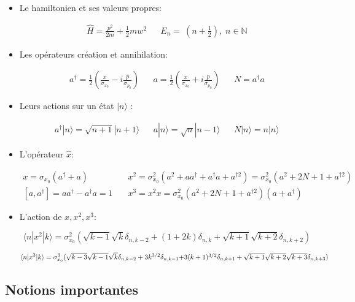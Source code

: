 \begin{itemize}[label=]

	\item Le hamiltonien et ses valeurs propres:

	\begin{align*}
		\hat{H}= \frac{p^2}{2m}+ \frac{1}{2}mw^2 &&
		E_n= \ \left(n+\frac{1}{2}\right), \; n\in \mathbb{N}
	\end{align*}

	\item Les opérateurs création et annihilation: 

	\begin{align*}
		a^{\dag}=\frac{1}{2}\left(\frac{x}{\sigma_{x_0}}-i\frac{p}{\sigma_{p_0}}\right) &&
		a=\frac{1}{2}\left(\frac{x}{\sigma_{x_0}}+i\frac{p}{\sigma_{p_0}}\right) &&
		N=a^{\dag}a
	\end{align*}

	\item Leurs actions sur un état $|n \rangle$ :

	\begin{align*}
		a^{\dag}|n \rangle = \sqrt{n+1}|n+1 \rangle &&
		a|n \rangle = \sqrt{n}|n-1 \rangle &&
		N|n \rangle = n|n \rangle
	\end{align*}

	\item L'opérateur $\hat{x}$:

	\begin{align*}
		x=\sigma_{x_0} (a^{\dag}+a)\qquad \quad &&
		x^2=\sigma_{x_0}^2 (a^2+ aa^{\dag}+a^{\dag}a+a^{\dag 2})=\sigma_{x_0}^2 (a^2+2N+1+a^{\dag 2}) \\
		[a,a^{\dag}]=aa^{\dag}-a^{\dag}a=1 && 
		x^3=x^2x=\sigma_{x_0}^2(a^2+2N+1+a^{\dag 2})(a+a^{\dag})
	\end{align*}

	\item L'action de $x, x^2, x^3$:

	\[
		\langle n|x^2|k \rangle=\sigma_{x_0}^2 (\sqrt{k-1}\sqrt{k}\delta_{n,k-2}+(1+2k)\delta_{n,k}+\sqrt{k+1}\sqrt{k+2}\delta_{n,k+2})
	\]

	\[
		\langle n|x^3|k \rangle=\sigma_{x_0}^3 (\sqrt{k-3}\sqrt{k-1}\sqrt{k}\delta_{n,k-2}+3k^{3/2}\delta_{n,k-1}$$ $$
		+3(k+1)^{3/2}\delta_{n,k+1}+\sqrt{k+1}\sqrt{k+2}\sqrt{k+3}\delta_{n,k+3})
	\]

\end{itemize}


\subsection{Notions importantes}


